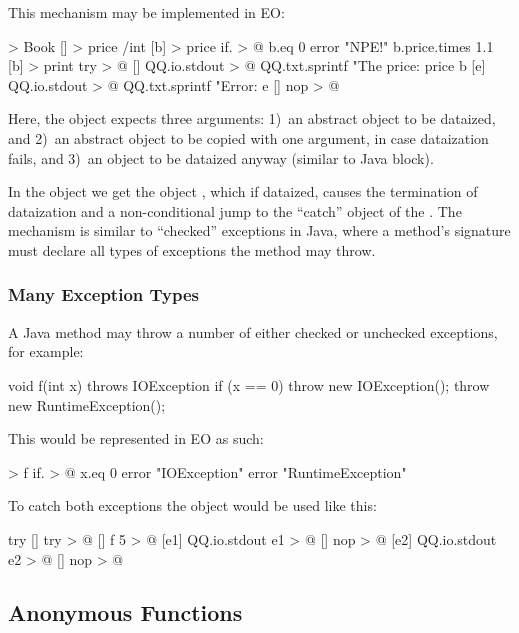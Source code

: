\documentclass[sigplan,11pt,nonacm,natbib=false]{acmart}
\begin{document}
This mechanism may be implemented in EO:

\begin{ffcode}
[] > Book
  [] > price /int
[b] > price
  if. > @
    b.eq 0
    error "NPE!"
    b.price.times 1.1
[b] > print
  try > @
    []
      QQ.io.stdout > @
        QQ.txt.sprintf
        "The price: %
        price b
    [e]
      QQ.io.stdout > @
        QQ.txt.sprintf
        "Error: %
        e
    []
      nop > @
\end{ffcode}

Here, the object  expects three arguments: 1)~an abstract object to be dataized, and 2)~an abstract object to be copied with one argument, in case dataization fails, and 3)~an object to be dataized anyway (similar to Java  block). 

In the object  we get the object , which if dataized, causes the termination of dataization and a non-conditional jump to the ``catch'' object of the . The mechanism is similar to ``checked'' exceptions in Java, where a method's signature must declare all types of exceptions the method may throw.

\subsubsection{Many Exception Types}

A Java method may throw a number of either checked or unchecked exceptions, for example:

\begin{ffcode}
void f(int x) throws IOException {
  if (x == 0) {
    throw new IOException();
  }
  throw new RuntimeException();
}
\end{ffcode}

This would be represented in EO as such:

\begin{ffcode}
[x] > f
  if. > @
    x.eq 0
    error "IOException"
    error "RuntimeException"
\end{ffcode}

To catch both exceptions the object  would be used like this:

\begin{ffcode}
try
  []
    try > @
      []
        f 5 > @
      [e1]
        QQ.io.stdout e1 > @
      []
        nop > @
  [e2]
    QQ.io.stdout e2 > @
  []
    nop > @
\end{ffcode}

\subsection{Anonymous Functions}
\label{sec:blocks}
\end{document}
